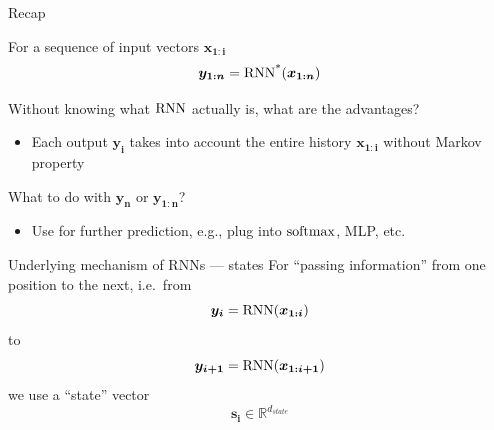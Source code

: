 \documentclass[12pt,aspectratio=169,handout]{beamer}
\begin{document}
\begin{frame}{Recap}

For a sequence of input vectors  $\bm{x_{1:i}}$
$$
\bm{y_{1:n}} = \operatorname*{RNN^{*}} (\bm{x_{1:n}})
$$

\pause

Without knowing what $\operatorname*{RNN}$ actually is, what are the advantages?
\pause
\begin{itemize}
	\item Each output $\bm{y_i}$ takes into account the entire history $\bm{x_{1:i}}$ without Markov property
\end{itemize}

What to do with $\bm{y_n}$ or $\bm{y_{1:n}}$?
\pause
\begin{itemize}
	\item Use for further prediction, e.g., plug into $\operatorname*{soft\!\max}$, MLP, etc.
\end{itemize}

\end{frame}



\begin{frame}{Underlying mechanism of RNNs --- states}
For ``passing information'' from one position to the next, i.e.\ from
$$\bm{y_i} = \operatorname*{RNN} (\bm{x_{1:i}})$$
to
$$\bm{y_{i+1}} = \operatorname*{RNN} (\bm{x_{1:i+1}})$$
we use a ``state'' vector
$$\bm{s_i} \in \mathbb{R}^{d_{state}}$$
\end{frame}
\end{document}
